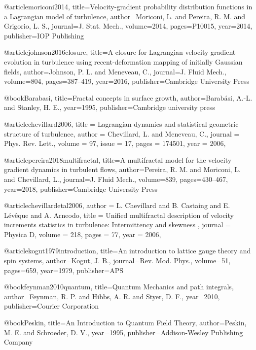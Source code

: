 
@article{moriconi2014,
  title={{Velocity-gradient probability distribution functions in a Lagrangian model of turbulence}},
  author={Moriconi, L. and Pereira, R. M. and Grigorio, L. S.},
  journal={J. Stat. Mech.},
  volume={2014},
  pages={P10015},
  year={2014},
  publisher={IOP Publishing}
}

@article{johnson2016closure,
  title={A closure for Lagrangian velocity gradient evolution in turbulence using recent-deformation mapping of initially Gaussian fields},
  author={Johnson, P. L. and Meneveau, C.},
  journal={J. Fluid Mech.},
  volume={804},
  pages={387--419},
  year={2016},
  publisher={Cambridge University Press}
}

@book{Barabasi,
  title={Fractal concepts in surface growth},
  author={Barab{\'a}si, A.-L. and Stanley, H. E.},
  year={1995},
  publisher={Cambridge university press}
}

@article{chevillard2006,
  title = {Lagrangian dynamics and statistical geometric structure of turbulence},
  author = {Chevillard, L. and Meneveau, C.},
  journal = {Phys. Rev. Lett.},
  volume = {97},
  issue = {17},
  pages = {174501},
  year = {2006},
}

@article{pereira2018multifractal,
  title={A multifractal model for the velocity gradient dynamics in turbulent flows},
  author={Pereira, R. M. and Moriconi, L. and Chevillard, L.},
  journal={J. Fluid Mech.},
  volume={839},
  pages={430--467},
  year={2018},
  publisher={Cambridge University Press}
}

@article{chevillardetal2006,
author = {L. Chevillard and B. Castaing and E. Lévêque and A. Arneodo},
title = {Unified multifractal description of velocity increments statistics in turbulence: Intermittency and skewness },
journal = {Physica D},
volume = {218},
pages = {77},
year = {2006},
}


@article{kogut1979introduction,
  title={An introduction to lattice gauge theory and spin systems},
  author={Kogut, J. B.},
  journal={Rev. Mod. Phys.},
  volume={51},
  pages={659},
  year={1979},
  publisher={APS}
}

@book{feynman2010quantum,
  title={Quantum Mechanics and path integrals},
  author={Feynman, R. P. and Hibbs, A. R. and Styer, D. F.},
  year={2010},
  publisher={Courier Corporation}
}

@book{Peskin,
  title={An Introduction to Quantum Field Theory},
  author={Peskin, M. E. and Schroeder, D. V.},
  year=1995,
  publisher={Addison-Wesley Publishing Company}
}

